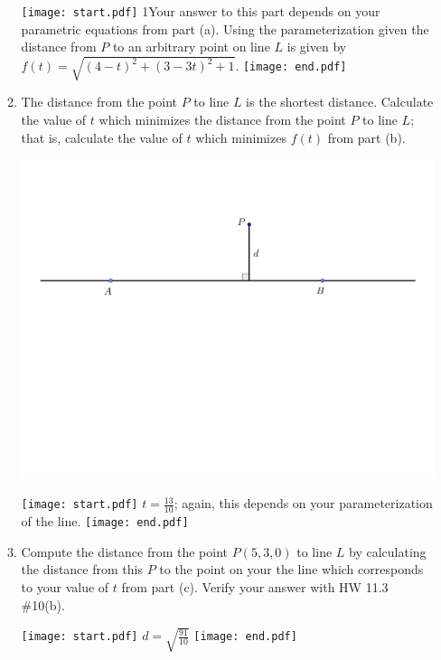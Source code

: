 \documentclass[12pt]{article}
\begin{document}
\begin{enumerate}
\begin{enumerate}
\texttt{[image: start.pdf]}
{{{1\linewidth}{Your answer to this part depends on your parametric equations from part (a).  Using the parameterization given the distance from $P$ to an arbitrary point on line $L$ is given by $f(t)=\sqrt{(4-t)^2+(3-3t)^2+1}$.}}}
\texttt{[image: end.pdf]}


\item The distance from the point $P$ to line $L$ is the shortest distance.  Calculate the value of $t$ which minimizes the distance from the point $P$ to line $L$; that is, calculate the value of $t$ which minimizes $f(t)$ from part (b).

\begin{center}
\includegraphics[scale=0.5]{length.pdf}
\end{center}

\texttt{[image: start.pdf]}
{{$t=\frac{13}{10}$; again, this depends on your parameterization of the line.}}
\texttt{[image: end.pdf]}


\item Compute the distance from the point $P(5,3,0)$ to line $L$ by calculating the distance from this $P$ to the point on your the line which corresponds to your value of $t$ from part (c).  Verify your answer with HW 11.3 \#10(b).

\texttt{[image: start.pdf]}
{{$d=\sqrt{\frac{91}{10}}$}}
\texttt{[image: end.pdf]}


\end{enumerate}


\end{enumerate}
\end{document}
